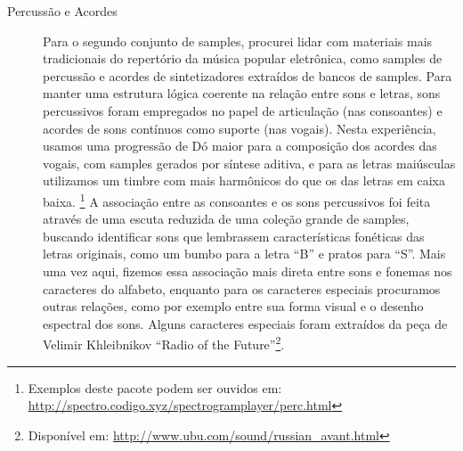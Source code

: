 \begin{description}
\item[Percussão e Acordes] Para o segundo conjunto de samples, procurei lidar com materiais mais tradicionais do repertório da música popular eletrônica, como samples de percussão e acordes de sintetizadores extraídos de bancos de samples. Para manter uma estrutura lógica coerente na relação entre sons e letras, sons percussivos foram empregados no papel de articulação (nas consoantes) e acordes de sons contínuos como suporte (nas vogais). Nesta experiência, usamos uma progressão de Dó maior para a composição dos acordes das vogais, com samples gerados por síntese aditiva, e para as letras maiúsculas utilizamos um timbre com mais harmônicos do que os das letras em caixa baixa. \footnote{Exemplos deste pacote podem ser ouvidos em: \url{http://spectro.codigo.xyz/spectrogramplayer/perc.html} }
A associação entre as consoantes e os sons percussivos foi feita através de uma escuta reduzida de uma coleção grande de samples, buscando identificar sons que lembrassem características fonéticas das letras originais, como um bumbo para a letra ``B'' e pratos para ``S''. Mais uma vez aqui, fizemos essa associação mais direta entre sons e fonemas nos caracteres do alfabeto, enquanto para os caracteres especiais procuramos outras relações, como por exemplo entre sua forma visual e o desenho espectral dos sons. Alguns caracteres especiais foram extraídos da peça de Velimir Khleibnikov ``Radio of the Future''\footnote{Disponível em: \url{http://www.ubu.com/sound/russian_avant.html}}.


\end{description}
